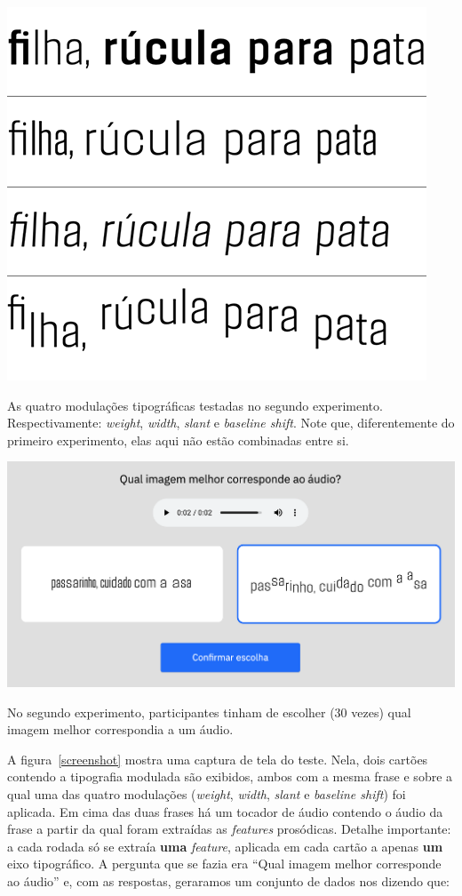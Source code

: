 \documentclass[a4paper]{tufte-handout}
\begin{document}
\begin{marginfigure}
  \includegraphics{imgs/modulacoes-experimento-2.png}
  \caption{As quatro modulações tipográficas testadas no segundo experimento. Respectivamente: \textit{weight}, \textit{width}, \textit{slant} e \textit{baseline shift}. Note que, diferentemente do primeiro experimento, elas aqui não estão combinadas entre si.}
  \label{mods-exp-2}
\end{marginfigure}

\begin{marginfigure}[\baselineskip]
  \includegraphics{imgs/test_screenshot2.png}
  \caption{No segundo experimento, participantes tinham de escolher (30 vezes) qual imagem melhor correspondia a um áudio.}
  \label{screenshot}
\end{marginfigure}


A figura~\ref{screenshot} mostra uma captura de tela do teste. Nela, dois cartões contendo a tipografia modulada são exibidos, ambos com a mesma frase e sobre a qual uma das quatro modulações (\textit{weight}, \textit{width}, \textit{slant} e \textit{baseline shift}) foi aplicada. Em cima das duas frases há um tocador de áudio contendo o áudio da frase a partir da qual foram extraídas as \textit{features} prosódicas. Detalhe importante: a cada rodada só se extraía \textbf{uma} \textit{feature}, aplicada em cada cartão a apenas \textbf{um} eixo tipográfico. A pergunta que se fazia era ``Qual imagem melhor corresponde ao áudio'' e, com as respostas, geraramos um conjunto de dados nos dizendo que: 
\end{document}
